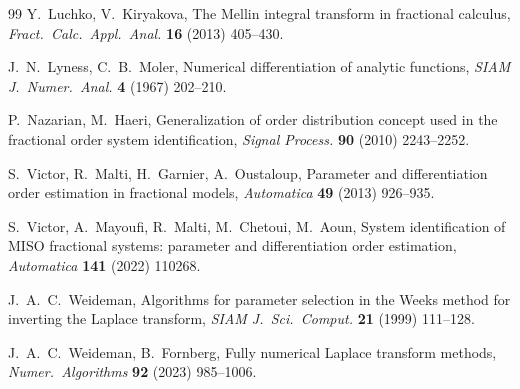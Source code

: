 \documentclass[11pt, a4paper]{article}
\theoremstyle{definition}
\theoremstyle{remark}
\begin{document}
\begin{thebibliography}{99}
 Y.~Luchko, V.~Kiryakova, The Mellin integral
transform in fractional calculus, \emph{Fract.\ Calc.\ Appl.\ Anal.}
\textbf{16} (2013) 405--430.

 J.~N.~Lyness, C.~B.~Moler, Numerical
differentiation of analytic functions, \emph{SIAM J.\ Numer.\ Anal.}
\textbf{4} (1967) 202--210.

 P.~Nazarian, M.~Haeri, Generalization of order
distribution concept used in the fractional order system identification,
\emph{Signal Process.} \textbf{90} (2010) 2243--2252.

 S.~Victor, R.~Malti, H.~Garnier, A.~Oustaloup,
Parameter and differentiation order estimation in fractional models,
\emph{Automatica} \textbf{49} (2013) 926--935.

 S.~Victor, A.~Mayoufi, R.~Malti, M.~Chetoui,
M.~Aoun, System identification of MISO fractional systems: parameter and
differentiation order estimation, \emph{Automatica} \textbf{141} (2022)
110268.

 J.~A.~C.~Weideman, Algorithms for parameter
selection in the Weeks method for inverting the Laplace transform,
\emph{SIAM J.\ Sci.\ Comput.} \textbf{21} (1999) 111--128.

 J.~A.~C.~Weideman, B.~Fornberg, Fully
numerical Laplace transform methods, \emph{Numer.\ Algorithms}
\textbf{92} (2023) 985--1006.

\end{thebibliography}
\end{document}
